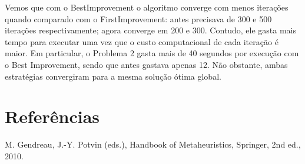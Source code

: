 \documentclass[
	12pt,				%
	oneside,			%
	a4paper,			%
	chapter=TITLE,
	sumario=tradicional,
	english,			%
	brazil				%
]{abntex2}
\begin{document}
Vemos que com o BestImprovement o algoritmo converge com menos iterações quando comparado com o FirstImprovement:
antes precisava de 300 e 500 iterações respectivamente; agora converge em 200 e 300.
Contudo,
ele gasta mais tempo para executar uma vez que o custo computacional de cada iteração é maior.
Em particular, o Problema 2 gasta mais de 40 segundos por execução com o Best Improvement, sendo que antes gastava
apenas 12.
Não obstante, ambas estratégias convergiram para a mesma solução ótima global.





\chapter{Referências}\label{cap:referencias} 

\noindent M. Gendreau, J.-Y. Potvin (eds.), Handbook of Metaheuristics, Springer, 2nd ed., 2010.
\end{document}
